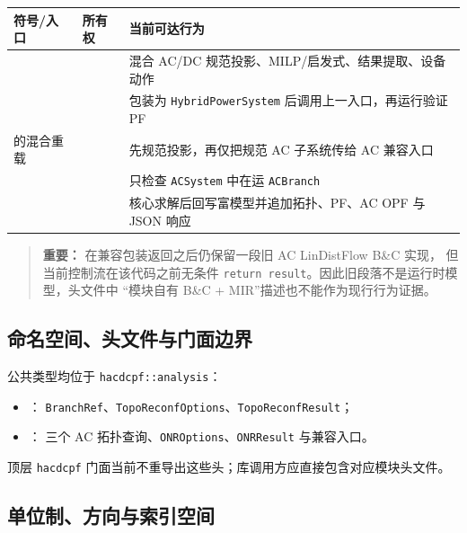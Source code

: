 \begin{center}\small
\begin{tabular}{@{}L{5.2cm}L{4.0cm}L{5.4cm}@{}}
\toprule
符号/入口 & 所有权 & 当前可达行为\\
\midrule
{} &
 &
混合 AC/DC 规范投影、MILP/启发式、结果提取、设备动作\\
 &
 &
包装为 \texttt{HybridPowerSystem} 后调用上一入口，再运行验证 PF\\
 的混合重载 &
 &
先规范投影，再仅把规范 AC 子系统传给 AC 兼容入口\\
 &
 &
只检查 \texttt{ACSystem} 中在运 \texttt{ACBranch}\\
 &
 &
核心求解后回写富模型并追加拓扑、PF、AC OPF 与 JSON 响应\\
\bottomrule
\end{tabular}
\end{center}

\begin{quote}\small\textbf{重要：}
 在兼容包装返回之后仍保留一段旧 AC LinDistFlow B\&C 实现，
但当前控制流在该代码之前无条件 \texttt{return result}。因此旧段落不是运行时模型，头文件中
“模块自有 B\&C + MIR”描述也不能作为现行行为证据。
\end{quote}

\subsection{命名空间、头文件与门面边界}

公共类型均位于 \texttt{hacdcpf::analysis}：
\begin{itemize}
  \item {}：
        \texttt{BranchRef}、\texttt{TopoReconfOptions}、\texttt{TopoReconfResult}；
  \item {}：
        三个 AC 拓扑查询、\texttt{ONROptions}、\texttt{ONRResult} 与兼容入口。
\end{itemize}
顶层 \texttt{hacdcpf} 门面当前不重导出这些头；库调用方应直接包含对应模块头文件。

\subsection{单位制、方向与索引空间}

